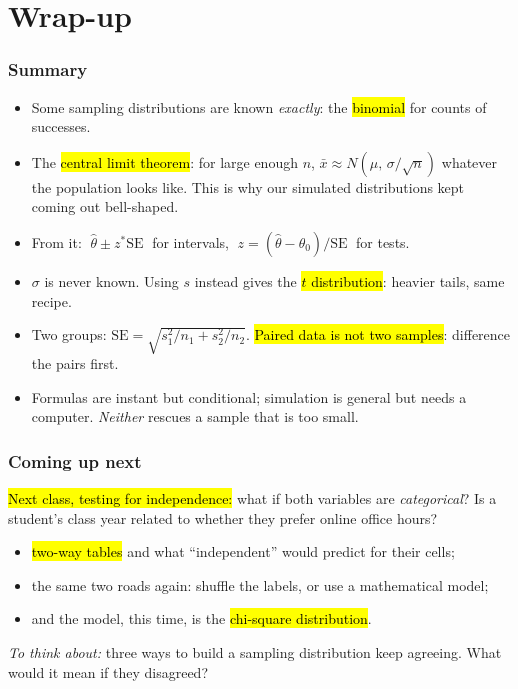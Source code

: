\documentclass[slidestop,compress,mathserif]{beamer}
\begin{document}
\section{Wrap-up}
\begin{frame}
\frametitle{Summary}

\begin{itemize}
\item Some sampling distributions are known \emph{exactly}: the \hl{binomial} for counts of successes.
\item The \hl{central limit theorem}: for large enough $n$, $\bar{x} \approx N(\mu,\, \sigma/\sqrt{n})$ whatever the population looks like. This is why our simulated distributions kept coming out bell-shaped.
\item From it: $\;\hat{\theta} \pm z^{*}\mathrm{SE}\;$ for intervals, $\;z = (\hat{\theta}-\theta_0)/\mathrm{SE}\;$ for tests.
\item $\sigma$ is never known. Using $s$ instead gives the \hl{$t$ distribution}: heavier tails, same recipe.
\item Two groups: $\mathrm{SE} = \sqrt{s_1^2/n_1 + s_2^2/n_2}$. \hl{Paired data is not two samples}: difference the pairs first.
\item Formulas are instant but conditional; simulation is general but needs a computer. \emph{Neither} rescues a sample that is too small.
\end{itemize}

\end{frame}

\begin{frame}
\frametitle{Coming up next}

\hl{Next class, testing for independence:} what if both variables are \emph{categorical}? Is a student's class year related to whether they prefer online office hours?

\begin{itemize}
\item \hl{two-way tables} and what ``independent'' would predict for their cells;
\item the same two roads again: shuffle the labels, or use a mathematical model;
\item and the model, this time, is the \hl{chi-square distribution}.
\end{itemize}

\vspace{0.3em}
\emph{To think about:} three ways to build a sampling distribution keep agreeing. What would it mean if they disagreed?

\end{frame}


\end{document}

